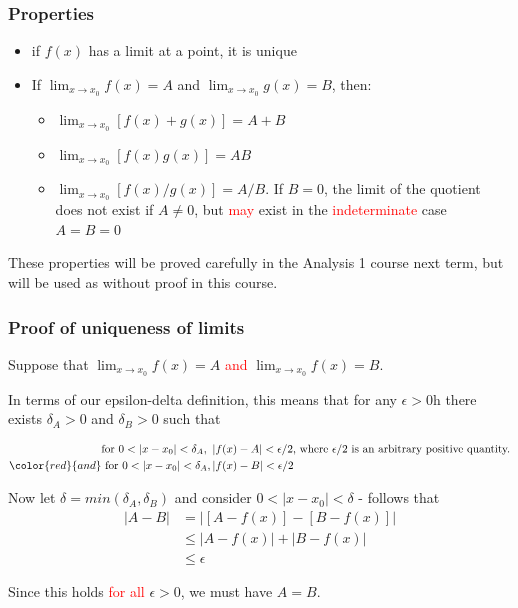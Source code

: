 \hypertarget{properties}{%
\subsubsection{Properties}\label{properties}}

\begin{itemize}
\tightlist
\item
  if \(f(x)\) has a limit at a point, it is unique
\item
  If \(\lim_{x \to x_0} f(x) = A\) and \(\lim_{x \to x_0} g(x) = B\), then:

  \begin{itemize}
  \tightlist
  \item
    \(\lim_{x \to x_0} [f(x) + g(x)] = A + B\)\\
  \item
    \(\lim_{x \to x_0} [f(x)g(x)] = AB\)\\
  \item
    \(\lim_{x \to x_0} [f(x) / g(x)] = A / B\). If \(B = 0\), the limit of the quotient does not exist if \(A \neq 0\), but \textcolor{red}{may} exist in the \textcolor{red}{indeterminate} case \(A = B = 0\)
  \end{itemize}
\end{itemize}

These properties will be proved carefully in the Analysis 1 course next term, but will be used as without proof in this course.

\hypertarget{proof-of-uniqueness-of-limits}{%
\subsubsection{Proof of uniqueness of limits}\label{proof-of-uniqueness-of-limits}}

Suppose that \(\lim_{x \to x_0} f(x) = A\) \textcolor{red}{and} \(\lim_{x \to x_0} f(x) = B\).

In terms of our epsilon-delta definition, this means that for any \(\epsilon > 0\)h there exists \(\delta_A > 0\) and \(\delta_B > 0\) such that

\begin{align*}
  &\text{for }0 < |x -x_0| < \delta_A,\ |f(x) - A| < \epsilon / 2 \text{, where } \epsilon / 2 \text{ is an arbitrary positive quantity.} \\
  \color{red}{and} &\text{ for } 0 < |x -x_0| < \delta_A, |f(x) - B| < \epsilon / 2
\end{align*}

Now let \(\delta = min(\delta_A, \delta_B)\) and consider \(0 < |x -x_0| < \delta\) - follows that
\begin{align*}
  |A - B| &= |[A - f(x)] - [B - f(x)]| \\
  &\leq |A - f(x)| + |B - f(x)| \\
  &\leq \epsilon
\end{align*}

Since this holds \textcolor{red}{for all} \(\epsilon > 0\), we must have \(A = B\).